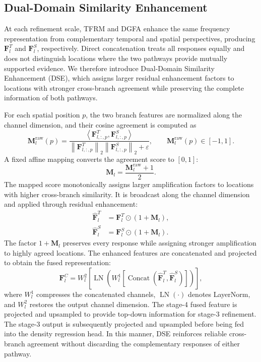 \documentclass[lettersize,journal]{IEEEtran}
\begin{document}
\subsection{Dual-Domain Similarity Enhancement}
\label{fuse}
At each refinement scale, TFRM and DGFA enhance the same frequency representation from complementary temporal and spatial perspectives, producing $\mathbf F_l^{T}$ and $\mathbf F_l^{S}$, respectively. Direct concatenation treats all responses equally and does not distinguish locations where the two pathways provide mutually supported evidence. We therefore introduce Dual-Domain Similarity Enhancement (DSE), which assigns larger residual enhancement factors to locations with stronger cross-branch agreement while preserving the complete information of both pathways.

For each spatial position $p$, the two branch features are normalized along the channel dimension, and their cosine agreement is computed as
\begin{equation}
\mathbf M_l^{\mathrm{raw}}(p)
=
\frac{
\left\langle
\mathbf F_{l,:,p}^{T},
\mathbf F_{l,:,p}^{S}
\right\rangle
}{
\left\|\mathbf F_{l,:,p}^{T}\right\|_2
\left\|\mathbf F_{l,:,p}^{S}\right\|_2
+\varepsilon
},
\qquad
\mathbf M_l^{\mathrm{raw}}(p)\in[-1,1].
\label{eq:dse_cos}
\end{equation}
A fixed affine mapping converts the agreement score to $[0,1]$:
\begin{equation}
\mathbf M_l
=
\frac{\mathbf M_l^{\mathrm{raw}}+1}{2}.
\label{eq:dse_gate}
\end{equation}
The mapped score monotonically assigns larger amplification factors to locations with higher cross-branch similarity. It is broadcast along the channel dimension and applied through residual enhancement:
\begin{equation}
\begin{aligned}
\hat{\mathbf F}_l^{T}
&=
\mathbf F_l^{T}\odot(1+\mathbf M_l),\\
\hat{\mathbf F}_l^{S}
&=
\mathbf F_l^{S}\odot(1+\mathbf M_l).
\end{aligned}
\label{eq:dse_enhance}
\end{equation}
The factor $1+\mathbf M_l$ preserves every response while assigning stronger amplification to highly agreed locations. The enhanced features are concatenated and projected to obtain the fused representation:
\begin{equation}
\mathbf F_l^{C}
=
W_l^{2}\!\left[
\operatorname{LN}\!\left(
W_l^{1}\!\left[
\operatorname{Concat}\!\left(
\hat{\mathbf F}_l^{T},
\hat{\mathbf F}_l^{S}
\right)
\right]
\right)
\right],
\label{eq:dse_fusion}
\end{equation}
where $W_l^{1}$ compresses the concatenated channels, $\operatorname{LN}(\cdot)$ denotes LayerNorm, and $W_l^{2}$ restores the output channel dimension. The stage-4 fused feature is projected and upsampled to provide top-down information for stage-3 refinement. The stage-3 output is subsequently projected and upsampled before being fed into the density regression head. In this manner, DSE reinforces reliable cross-branch agreement without discarding the complementary responses of either pathway.
\end{document}
